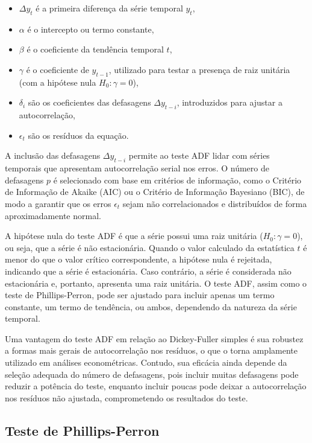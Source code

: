 \documentclass[12pt,oneside,a4paper,chapter=TITLE,english,brazil,sumario=abnt-6027-2012]{abntex2}
\begin{document}
\begin{itemize}
	\item \( \Delta y_t \) é a primeira diferença da série temporal \( y_t \),
	\item \( \alpha \) é o intercepto ou termo constante,
	\item \( \beta \) é o coeficiente da tendência temporal \( t \),
	\item \( \gamma \) é o coeficiente de \( y_{t-1} \), utilizado para testar a presença de raiz unitária (com a hipótese nula \( H_0: \gamma = 0 \)),
	\item \( \delta_i \) são os coeficientes das defasagens \( \Delta y_{t-i} \), introduzidos para ajustar a autocorrelação,
	\item \( \epsilon_t \) são os resíduos da equação.
\end{itemize}

A inclusão das defasagens \( \Delta y_{t-i} \) permite ao teste ADF lidar com séries temporais que apresentam autocorrelação serial nos erros. O número de defasagens \( p \) é selecionado com base em critérios de informação, como o Critério de Informação de Akaike (AIC) ou o Critério de Informação Bayesiano (BIC), de modo a garantir que os erros \( \epsilon_t \) sejam não correlacionados e distribuídos de forma aproximadamente normal.

A hipótese nula do teste ADF é que a série possui uma raiz unitária (\( H_0: \gamma = 0 \)), ou seja, que a série é não estacionária. Quando o valor calculado da estatística \( t \) é menor do que o valor crítico correspondente, a hipótese nula é rejeitada, indicando que a série é estacionária. Caso contrário, a série é considerada não estacionária e, portanto, apresenta uma raiz unitária. O teste ADF, assim como o teste de Phillips-Perron, pode ser ajustado para incluir apenas um termo constante, um termo de tendência, ou ambos, dependendo da natureza da série temporal.

Uma vantagem do teste ADF em relação ao Dickey-Fuller simples é sua robustez a formas mais gerais de autocorrelação nos resíduos, o que o torna amplamente utilizado em análises econométricas. Contudo, sua eficácia ainda depende da seleção adequada do número de defasagens, pois incluir muitas defasagens pode reduzir a potência do teste, enquanto incluir poucas pode deixar a autocorrelação nos resíduos não ajustada, comprometendo os resultados do teste.

\subsection{Teste de Phillips-Perron}
\end{document}
